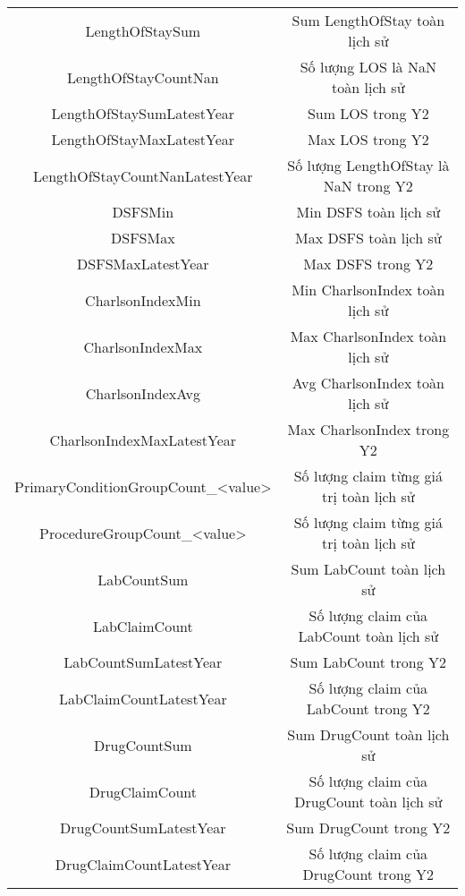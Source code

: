 \begin{longtable}[c]{| c | c |}
    LengthOfStaySum & Sum LengthOfStay toàn lịch sử \\
    LengthOfStayCountNan & Số lượng LOS là NaN toàn lịch sử \\ 
    LengthOfStaySumLatestYear & Sum LOS trong Y2 \\
    LengthOfStayMaxLatestYear & Max LOS trong Y2 \\
    LengthOfStayCountNanLatestYear & Số lượng LengthOfStay là NaN trong Y2 \\ 
    DSFSMin & Min DSFS toàn lịch sử \\
    DSFSMax & Max DSFS toàn lịch sử \\
    DSFSMaxLatestYear & Max DSFS trong Y2 \\
    CharlsonIndexMin & Min CharlsonIndex toàn lịch sử \\
    CharlsonIndexMax & Max CharlsonIndex toàn lịch sử \\
    CharlsonIndexAvg & Avg CharlsonIndex toàn lịch sử \\
    CharlsonIndexMaxLatestYear & Max CharlsonIndex trong Y2 \\
    PrimaryConditionGroupCount\_<value> & Số lượng claim từng giá trị toàn lịch sử \\
    ProcedureGroupCount\_<value> & Số lượng claim từng giá trị toàn lịch sử \\
    LabCountSum & Sum LabCount toàn lịch sử \\
    LabClaimCount & Số lượng claim của LabCount toàn lịch sử \\
    LabCountSumLatestYear & Sum LabCount trong Y2 \\
    LabClaimCountLatestYear & Số lượng claim của LabCount trong Y2 \\
    DrugCountSum & Sum DrugCount toàn lịch sử \\
    DrugClaimCount & Số lượng claim của DrugCount toàn lịch sử \\
    DrugCountSumLatestYear & Sum DrugCount trong Y2 \\
    DrugClaimCountLatestYear & Số lượng claim của DrugCount trong Y2 \\
    \hline
\end{longtable}